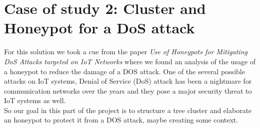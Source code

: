 

\section{Case of study 2: Cluster and Honeypot for a DoS attack}

For this solution we took a cue from the paper \textit{Use of Honeypots for Mitigating DoS Attacks 
targeted on IoT Networks}\cite{7944057} where we found an analysis of the usage of a honeypot to reduce the damage of a DOS attack. One of the several possible attacks on IoT 
systems, Denial of Service (DoS) attack has been a nightmare for 
communication networks over the years and they 
pose a major security threat to IoT systems as well.\\
So our goal in this part of the project is to structure a tree cluster and elaborate an honeypot to protect it from a DOS attack, maybe creating some context.
  
